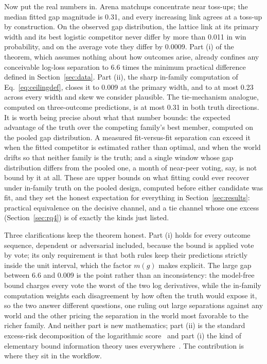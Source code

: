 \documentclass[10pt]{article}
\begin{document}
Now put the real numbers in. Arena matchups concentrate near toss-ups;
the median fitted gap magnitude is 0.31, and every increasing link
agrees at a toss-up by construction. On the observed gap
distribution, the lattice link at its primary width and its best
logistic competitor never differ by more than 0.011 in win
probability, and on the average vote they differ by 0.0009. Part (i)
of the theorem, which assumes nothing about how outcomes arise,
already confines any conceivable log-loss separation to 6.6 times the
minimum practical difference defined in Section~\ref{sec:data}. Part
(ii), the sharp in-family computation of Eq.~\eqref{eq:ceilingdef},
closes it to 0.009 at the primary width, and to at most 0.23 across
every width and skew we consider plausible. The tie-mechanism
analogue, computed on three-outcome predictions, is at most 0.31 in
both truth directions. It is worth being precise about what that
number bounds: the expected advantage of the truth over the competing
family's best member, computed on the pooled gap distribution. A
measured fit-versus-fit separation can exceed it when the fitted
competitor is estimated rather than optimal, and when the world
drifts so that neither family is the truth; and a single window
whose gap distribution differs from the pooled one, a month of
near-peer voting, say, is not bound by it at all. These are upper
bounds on what fitting could ever recover under in-family truth on
the pooled design, computed before either candidate was fit, and
they set the honest expectation for everything in
Section~\ref{sec:results}: practical equivalence on the decisive
channel, and a tie channel whose one excess
(Section~\ref{sec:rq4}) is of exactly the kinds just listed.

Three clarifications keep the theorem honest. Part (i) holds for every
outcome sequence, dependent or adversarial included, because the bound
is applied vote by vote; its only requirement is that both rules keep
their predictions strictly inside the unit interval, which the factor
$m(g)$ makes explicit. The large gap between 6.6 and 0.009 is the
point rather than an inconsistency: the model-free bound charges every
vote the worst of the two log derivatives, while the in-family
computation weights each disagreement by how often the truth would
expose it, so the two answer different questions, one ruling out large
separations against any world and the other pricing the separation in
the world most favorable to the richer family. And neither part is
new mathematics; part (ii) is the standard excess-risk decomposition
of the logarithmic score~\citep{gneitingraftery2007} and part (i) the
kind of elementary bound information theory uses
everywhere~\citep{coverthomas2006}. The contribution is where they
sit in the workflow.
\end{document}
